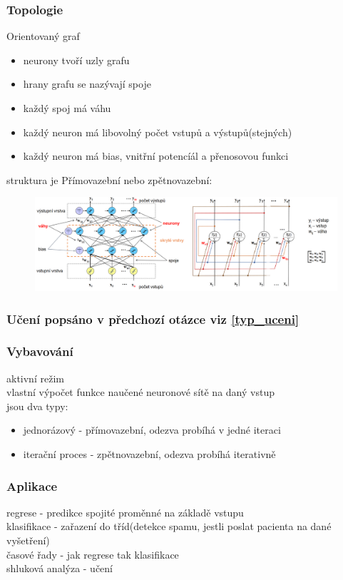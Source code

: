 \subsubsection*{Topologie}
Orientovaný graf
\begin{itemize}
    \item neurony tvoří uzly grafu
    \item hrany grafu se nazývají spoje 
    \item každý spoj má váhu
    \item každý neuron má libovolný počet vstupů a výstupů(stejných)
    \item každý neuron má bias, vnitřní potencíál a přenosovou funkci
\end{itemize}
struktura je Přímovazební nebo zpětnovazební:
\begin{figure}[H]
    \includegraphics[scale = 0.5]{images/struktury.png}
\end{figure}

\subsubsection*{Učení popsáno v předchozí otázce viz \ref{typ_uceni}}

\subsubsection*{Vybavování}
aktivní režim\\
vlastní výpočet funkce naučené neuronové sítě na daný vstup\\
jsou dva typy:
\begin{itemize}
    \item jednorázový - přímovazební, odezva probíhá v jedné iteraci
    \item iterační proces - zpětnovazební, odezva probíhá iterativně
\end{itemize}

\subsubsection*{Aplikace}
regrese - predikce spojité proměnné na základě vstupu\\
klasifikace - zařazení do tříd(detekce spamu, jestli poslat pacienta na dané vyšetření)\\
časové řady - jak regrese tak klasifikace\\
shluková analýza - učení 

